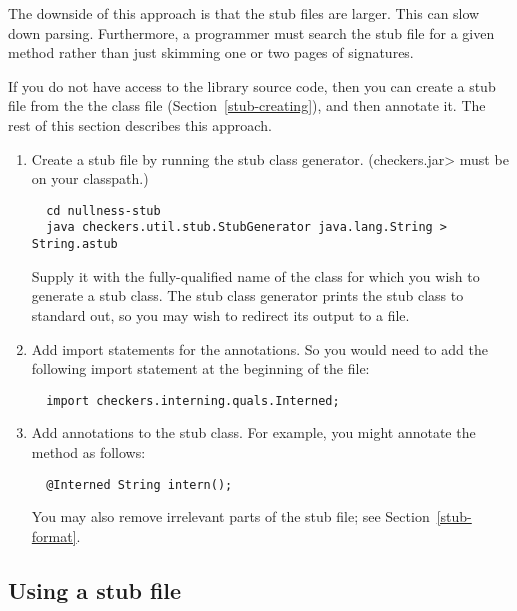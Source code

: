 The downside of this approach is that the stub files are larger.  This can
slow down parsing.  Furthermore, a programmer must search the stub file
for a given method rather than just skimming one or two pages of signatures.

If you do not have access to the library source code, then you can create a
stub file from the the class file (Section~\ref{stub-creating}),
and then annotate it.  The rest of this section describes this approach.


\begin{enumerate}

\item
  Create a stub file by running the stub class generator.  (\<checkers.jar>
  must be on your classpath.)

\begin{Verbatim}
  cd nullness-stub
  java checkers.util.stub.StubGenerator java.lang.String > String.astub
\end{Verbatim}

  Supply it with the fully-qualified name of the class for which you wish to
  generate a stub class.  The stub class generator prints the
  stub class to standard out, so you may wish to redirect its output to a
  file.

\item
  Add import statements for the annotations.  So you would need to
add the following import statement at the beginning of the file:

\begin{Verbatim}
  import checkers.interning.quals.Interned;
\end{Verbatim}

\item
  Add annotations to the stub class.  For example, you might annotate
  the  method as follows:

\begin{Verbatim}
  @Interned String intern();
\end{Verbatim}

  You may also remove irrelevant parts of the stub file; see
  Section~\ref{stub-format}.

\end{enumerate}

\subsection{Using a stub file\label{stub-using}}

